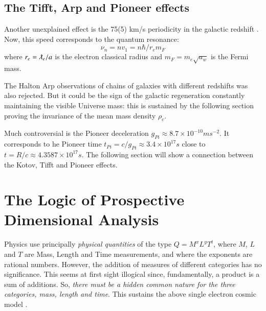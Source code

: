 \documentclass[twoside,draft]{article}
\begin{document}
\begin{sloppypar}
\subsection{The Tifft, Arp and Pioneer effects}

Another unexplained effect is the 75(5) km/s periodicity in the galactic redshift \cite{Tifft}. Now, this speed corresponds to the quantum resonance: $$\nu_{n} = nv_{1} =n\hbar /r_{e} m_{F} $$ where $r_{e} = \lambdabar_e/a$ is the electron classical radius and $m_{F} = m_{e}\sqrt{a_{w}}$ is the Fermi mass.

The Halton Arp observations of chains of galaxies with different redshifts \cite{Arp} was also rejected. But it could be the sign of the galactic regeneration constantly maintaining the visible Universe mass: this is sustained by the following section proving the invariance of the mean mass density $\rho_{c}$.

Much controversial is the Pioneer deceleration \cite{Nieto} $g_{Pi} \approx 8.7 \times 10^{-10} ms^{-2}$. It corresponds to he Pioneer time $t_{Pi} = c/g_{Pi} \approx 3.4 \times 10^{17} s $ close to $t = R/c \approx 4.3587 \times 10^{17} s $. The following section will show a connection between the Kotov, Tifft and Pioneer effects.

\section{The Logic of Prospective Dimensional Analysis}

Physics use principally \textit{physical quantities} of the type $Q = M^{x} L^{y} T^{t}$, where $M$, $L$ and $T$ are Mass, Length and Time measurements, and where the exponents are rational numbers. However, the addition of measures of different categories has no significance. This seems at first sight illogical since, fundamentally, a product is a sum of additions. So, \textit{there must be a hidden common nature for the three categories, mass, length and time}. This sustains the above single electron cosmic model \cite{Sanchez1}. 


\end{sloppypar}
\end{document}
